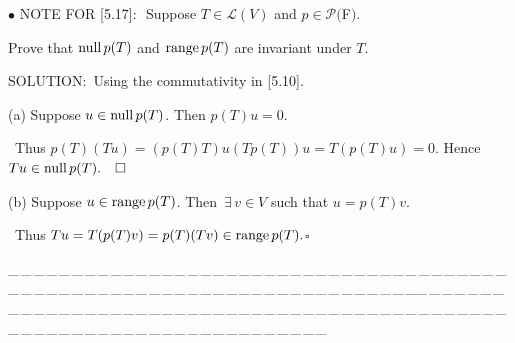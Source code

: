 \documentclass[a4paper, 11pt, UTF8]{article}
\def\range{\textup{range}\,}
\def\null{\textup{null\,}}
\def\Lm{\mathcal{L}}
\def\Po{\mathcal{P}}
\begin{document}
\begin{large}
{\small $\bullet$} {\timesbf\Large N{\normalsize OTE} F{\normalsize OR} [5.17]:} \,\,{\timessl\Large Suppose $T\in\Lm(V)$ and $p\in\Po(${\timesbf F}$)$.}\par\qquad\qquad\qquad\qquad\qquad
{\timessl\Large Prove that $\null p(T)$ and $\range p(T)$ are invariant under $T$.}\par
{\timesbf S\footnotesize{OLUTION:}}\,\,\,Using the commutativity in [5.10].\par\quad
(a) Suppose $u\in\null p(T)$. Then $p(T)u = 0$.\par\qquad\,
Thus $p(T)(Tu) = (p(T) T)u (Tp(T))u=T(p(T)u) = 0$. Hence $Tu\in\null p(T).\quad\square$\par\quad
(b) Suppose $u\in\range p(T)$. Then $\,\exists\,v\in V$ such that $u = p(T)v$.\par\qquad\,
Thus $Tu = T(p(T)v) = p(T)(Tv)\in\range p(T).$\quad$\square$\par
{\tiny \_\,\_\,\_\,\_\,\_\,\_\,\_\,\_\,\_\,\_\,\_\,\_\,\_\,\_\,\_\,\_\,\_\,\_\,\_\,\_\,\_\,\_\,\_\,\_\,\_\,\_\,\_\,\_\,\_\,\_\,\_\,\_\,\_\,\_\,\_\,\_\,\_\,\_\,\_\,\_\,\_\,\_\,\_\,\_\,\_\,\_\,\_\,\_\,\_\,\_\,\_\,\_\,\_\,\_\,\_\,\_\,\_\,\_\,\_\,\_\,\_\,\_\,\_\,\_\,\_\,\_\,\_\,\_\,\_\,\_\,\_\_\,\_\,\_\,\_\,\_\,\_\,\_\,\_\,\_\,\_\,\_\,\_\,\_\,\_\,\_\,\_\,\_\,\_\,\_\,\_\,\_\,\_\,\_\,\_\,\_\,\_\,\_\,\_\,\_\,\_\,\_\,\_\,\_\,\_\,\_\,\_\,\_\,\_\,\_\,\_\,\_\,\_\,\_\,\_\,\_\,\_\,\_\,\_\,\_\,\_\,\_\,\_\,\_\,\_\,\_\,\_\,\_\,\_\,\_\,\_\,\_\,\_\,\_\,\_\,\_\,\_\,\_\,\_\,\_\,\_\,\_}\par


\end{large}
\end{document}
